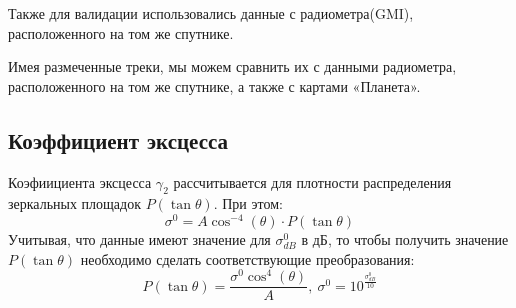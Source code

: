 Также для валидации использовались данные с радиометра(GMI), расположенного на том же спутнике.  

Имея размеченные треки, мы можем сравнить их с данными радиометра, расположенного на том же спутнике, а также с
картами «Планета».


\subsection{Коэффициент эксцесса}

Коэфиициента эксцесса $\gamma_2$ рассчитывается для плотности распределения зеркальных площадок $P(\tan \theta)$. При этом: 
\begin{equation}
  \sigma^0 = A \cos^{-4}(\theta) \cdot P(\tan \theta)
  \label{eq:8}
\end{equation}
Учитывая, что данные имеют значение для $\sigma^0_{dB}$ в дБ, то чтобы получить значение $P(\tan \theta)$ необходимо сделать
соответствующие преобразования:
\begin{equation}
  P(\tan \theta) =  \frac{\sigma^0 \cos^4(\theta)}{A},~ \sigma^0 = 10^{\frac{\sigma^0_{dB}}{10}}
  \label{eq:9}
\end{equation}

